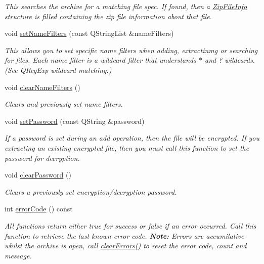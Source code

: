 \begin{DoxyCompactItemize}
\begin{DoxyCompactList}\small\item\em This searches the archive for a matching file spec. If found, then a \hyperlink{class_zip_file_info}{Zip\+File\+Info} structure is filled containing the zip file information about that file. \end{DoxyCompactList}\item 
void \hyperlink{class_ab_zip_a80724c61b6812aaea06f575860bed8e6}{set\+Name\+Filters} (const Q\+String\+List \&name\+Filters)
\begin{DoxyCompactList}\small\item\em This allows you to set specific name filters when adding, extractinmg or searching for files. Each name filter is a wildcard filter that understands $\ast$ and ? wildcards. (See Q\+Reg\+Exp wildcard matching.) \end{DoxyCompactList}\item 
void \hyperlink{class_ab_zip_a23197e4aeb30549b15adc0e8b5eaf239}{clear\+Name\+Filters} ()
\begin{DoxyCompactList}\small\item\em Clears and previously set name filters. \end{DoxyCompactList}\item 
void \hyperlink{class_ab_zip_a31f7636ca8c3ca66fd52b57c0f5b2328}{set\+Password} (const Q\+String \&password)
\begin{DoxyCompactList}\small\item\em If a password is set during an add operation, then the file will be encrypted. If you extracting an existing encrypted file, then you must call this function to set the password for decryption. \end{DoxyCompactList}\item 
void \hyperlink{class_ab_zip_afd354e102978d775abddf3263363c8d2}{clear\+Password} ()
\begin{DoxyCompactList}\small\item\em Clears a previously set encryption/decryption password. \end{DoxyCompactList}\item 
int \hyperlink{class_ab_zip_aed3be53eab7d843ca48943247b03d8c4}{error\+Code} () const 
\begin{DoxyCompactList}\small\item\em All functions return either true for success or false if an error occurred. Call this function to retrieve the last known error code. {\bfseries Note\+:} Errors are accumilative whilst the archive is open, call \hyperlink{class_ab_zip_a4e08361f95e0bc46aae1599232674230}{clear\+Errors()} to reset the error code, count and message. \end{DoxyCompactList}\item 

\end{DoxyCompactItemize}
